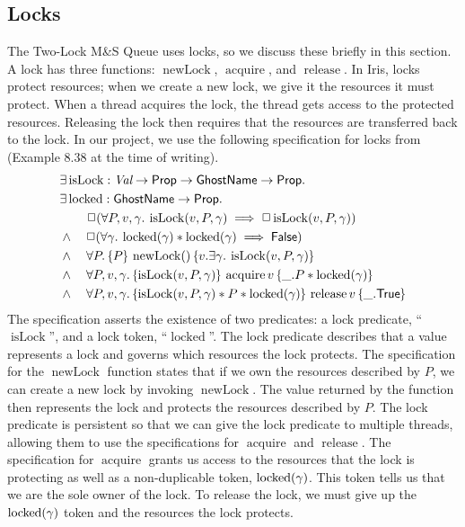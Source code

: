 \documentclass[a4paper, 10pt]{report}
\theoremstyle{definition}
\newcommand{\isLock}{\operatorname{isLock}}
\newcommand{\locked}{\operatorname{locked}}
\newcommand{\newLock}{\operatorname{newLock}}
\newcommand{\acquire}{\operatorname{acquire}}
\newcommand{\release}{\operatorname{release}}
\newcommand{\msq}{M\&S Queue}
\newcommand{\tlmsq}{Two-Lock \msq{}}
\begin{document}
\subsection{Locks}
\label{Pre:iris:sub:locks}

The \tlmsq{} uses locks, so we discuss these briefly in this section. A lock has three functions: $\newLock$, $\acquire$, and $\release$. In Iris, locks protect resources; when we create a new lock, we give it the resources it must protect. When a thread acquires the lock, the thread gets access to the protected resources. Releasing the lock then requires that the resources are transferred back to the lock. In our project, we use the following specification for locks from \citet{gentleiris} (Example 8.38 at the time of writing).
\begin{align*}
  &\Exists \isLock : \Val \to \Prop \to \textlog{GhostName} \to \Prop.\nonumber\\
  &\Exists \locked : \textlog{GhostName} \to \Prop.\nonumber\\
  &\quad\quad\persistently(\All P, v, \gamma. \isLock(v,P,\gamma) \implies \persistently \isLock(v,P,\gamma))\\
  &\land\quad\persistently(\All \gamma. \locked(\gamma) \ast \locked(\gamma) \implies \FALSE)\\
  &\land\quad\All P.\hoare{P}{\newLock ()}{v.\Exists \gamma.\isLock(v,P,\gamma)}\\
  &\land\quad\All P, v, \gamma.\hoare{\isLock(v,P,\gamma)}{\acquire v}{\_.P \ast \locked(\gamma)}\\
  &\land\quad\All P, v, \gamma.\hoare{\isLock(v,P,\gamma) \ast P \ast \locked(\gamma)}{\release v}{\_.\TRUE}
\end{align*}
The specification asserts the existence of two predicates: a lock predicate, ``$\isLock$'', and a lock token, ``$\locked$''. The lock predicate describes that a value represents a lock and governs which resources the lock protects. The specification for the $\newLock$ function states that if we own the resources described by $P$, we can create a new lock by invoking $\newLock$. The value returned by the function then represents the lock and protects the resources described by $P$. The lock predicate is persistent so that we can give the lock predicate to multiple threads, allowing them to use the specifications for $\acquire$ and $\release$. The specification for $\acquire$ grants us access to the resources that the lock is protecting as well as a non-duplicable token, $\locked(\gname)$. This token tells us that we are the sole owner of the lock. To release the lock, we must give up the $\locked(\gname)$ token and the resources the lock protects.
\end{document}
